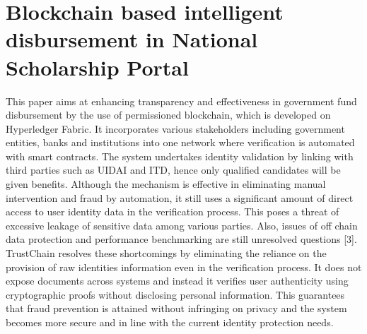 \section{Blockchain based intelligent disbursement in National Scholarship Portal
}
\endgroup
This paper aims at enhancing transparency and effectiveness in government fund disbursement by the use of permissioned blockchain, which is developed on Hyperledger Fabric. It incorporates various stakeholders including government entities, banks and institutions into one network where verification is automated with smart contracts. The system undertakes identity validation by linking with third parties such as UIDAI and ITD, hence only qualified candidates will be given benefits. Although the mechanism is effective in eliminating manual intervention and fraud by automation, it still uses a significant amount of direct access to user identity data in the verification process. This poses a threat of excessive leakage of sensitive data among various parties. Also, issues of off chain data protection and performance benchmarking are still unresolved questions [3]. TrustChain resolves these shortcomings by eliminating the reliance on the provision of raw identities information even in the verification process. It does not expose documents across systems and instead it verifies user authenticity using cryptographic proofs without disclosing personal information. This guarantees that fraud prevention is attained without infringing on privacy and the system becomes more secure and in line with the current identity protection needs.\\

\begingroup
\linespread{0.8}\selectfont
